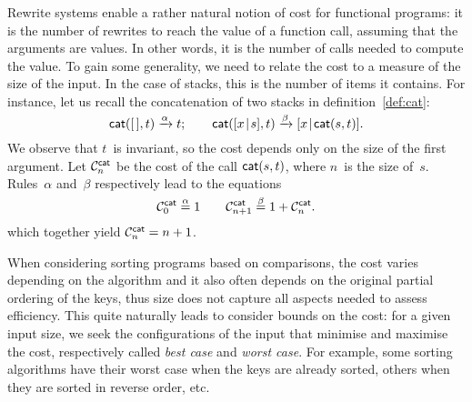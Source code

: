 
Rewrite systems enable a rather natural notion of cost for functional
programs: it is the number of rewrites to reach the value of a
function call, assuming that the arguments are values. In other words,
it is the number of calls needed to compute the value. To gain some
generality, we need to relate the cost to a measure of the size of the
input. In the case of stacks, this is the number of items it
contains. For instance, let us recall the concatenation of two stacks in
definition~\eqref{def:cat}:
\begin{equation*}
\fun{cat}(        \el,t) \xrightarrow{\smash{\alpha}} t;\qquad
\fun{cat}(\cons{x}{s},t) \xrightarrow{\smash{\beta}}
\cons{x}{\fun{cat}(s,t)}.
\end{equation*}
We observe that \(t\)~is invariant, so the cost depends only on the
size of the first argument. Let
\(\C{\fun{cat}}{n}\) be the cost of the
call \(\fun{cat}(s,t)\), where \(n\)~is the
size of~\(s\). Rules~\(\alpha\) and~\(\beta\) respectively lead to the
equations
\begin{equation*}
\C{\fun{cat}}{0} \eqn{\smash{\alpha}} 1\qquad
\C{\fun{cat}}{n+1} \eqn{\smash{\beta}} 1 + \C{\fun{cat}}{n}.
\end{equation*}
which together yield \(\C{\fun{cat}}{n} = n +
1\).\label{cost:cat}



When considering sorting programs based on comparisons, the cost
varies depending on the algorithm and it also often depends on the
original partial ordering of the keys, thus size does not capture all
aspects needed to assess efficiency. This quite naturally leads to
consider bounds on the cost: for a given input size, we seek the
configurations of the input that minimise and maximise the cost,
respectively called \emph{best case} and \emph{worst case}. For
example, some sorting algorithms have their worst case when the keys
are already sorted, others when they are sorted in reverse order, etc.


\label{par:mean_sort}

